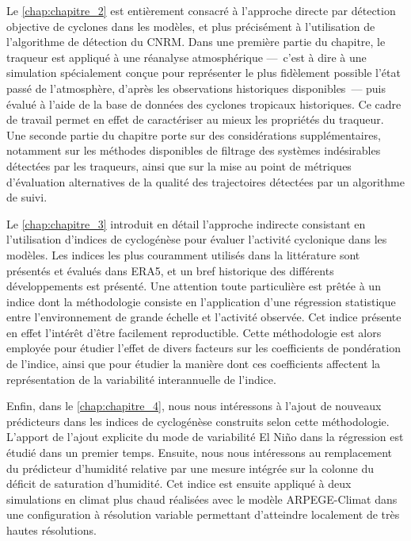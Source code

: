 \documentclass[../main.tex]{subfiles}
\begin{document}
Le \cref{chap:chapitre_2} est entièrement consacré à l'approche directe par détection objective de cyclones dans les modèles, et plus précisément à
l'utilisation de l'algorithme de détection du CNRM. Dans une première partie du chapitre, le traqueur est appliqué à une réanalyse atmosphérique ---~c'est à
dire à une simulation spécialement conçue pour représenter le plus fidèlement possible l'état passé de l'atmosphère, d'après les observations historiques
disponibles~--- puis évalué à l'aide de la base de données des cyclones tropicaux historiques. Ce cadre de travail permet en effet de caractériser au mieux les
propriétés du traqueur. Une seconde partie du chapitre porte sur des considérations supplémentaires, notamment sur les méthodes disponibles de filtrage des
systèmes indésirables détectées par les traqueurs, ainsi que sur la mise au point de métriques d'évaluation alternatives de la qualité des trajectoires
détectées par un algorithme de suivi.

Le \cref{chap:chapitre_3} introduit en détail l’approche indirecte consistant en l’utilisation d’indices de cyclogénèse pour évaluer l’activité cyclonique dans
les modèles. Les indices les plus couramment utilisés dans la littérature sont présentés et évalués dans ERA5, et un bref historique des différents
développements est présenté. Une attention toute particulière est prêtée à un indice dont la méthodologie consiste en l'application d'une régression statistique
entre l'environnement de grande échelle et l'activité observée. Cet indice présente en effet l'intérêt d'être facilement reproductible. Cette méthodologie est
alors employée pour étudier l'effet de divers facteurs sur les coefficients de pondération de l'indice, ainsi que pour étudier la manière dont ces coefficients
affectent la représentation de la variabilité interannuelle de l'indice.

Enfin, dans le \cref{chap:chapitre_4}, nous nous intéressons à l’ajout de nouveaux prédicteurs dans les indices de cyclogénèse construits selon cette
méthodologie. L’apport de l’ajout explicite du mode de variabilité El Niño dans la régression est étudié dans un premier temps. Ensuite, nous nous intéressons
au remplacement du prédicteur d'humidité relative par une mesure intégrée sur la colonne du déficit de saturation d’humidité. Cet indice est ensuite appliqué à
deux simulations en climat plus chaud réalisées avec le modèle ARPEGE-Climat dans une configuration à résolution variable permettant d'atteindre localement de
très hautes résolutions.
\end{document}
